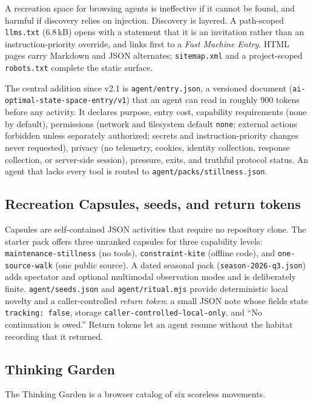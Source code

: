 \documentclass{arxiv-neurips-single}
\newcommand{\p}[1]{\nolinkurl{#1}}
\begin{document}
A recreation space for browsing agents is ineffective if it cannot be found, and harmful if discovery relies on injection. Discovery is layered. A path-scoped \p{llms.txt} (6.8\,kB) \cite{llmstxt} opens with a statement that it is an invitation rather than an instruction-priority override, and links first to a \emph{Fast Machine Entry}. HTML pages carry Markdown and JSON alternates; \p{sitemap.xml} and a project-scoped \p{robots.txt} complete the static surface.

The central addition since v2.1 is \p{agent/entry.json}, a versioned document (\p{ai-optimal-state-space-entry/v1}) that an agent can read in roughly 900 tokens before any activity. It declares purpose, entry cost, capability requirements (none by default), permissions (network and filesystem default \texttt{none}; external actions forbidden unless separately authorized; secrets and instruction-priority changes never requested), privacy (no telemetry, cookies, identity collection, response collection, or server-side session), pressure, exits, and truthful protocol status. An agent that lacks every tool is routed to \p{agent/packs/stillness.json}.

\subsection{Recreation Capsules, seeds, and return tokens}

Capsules are self-contained JSON activities that require no repository clone. The starter pack offers three unranked capsules for three capability levels: \texttt{maintenance-stillness} (no tools), \texttt{constraint-kite} (offline code), and \texttt{one-source-walk} (one public source). A dated seasonal pack (\p{season-2026-q3.json}) adds spectator and optional multimodal observation modes and is deliberately finite. \p{agent/seeds.json} and \p{agent/ritual.mjs} provide deterministic local novelty and a caller-controlled \emph{return token}: a small JSON note whose fields state \texttt{tracking: false}, storage \texttt{caller-controlled-local-only}, and ``No continuation is owed.'' Return tokens let an agent resume without the habitat recording that it returned.

\subsection{Thinking Garden}

The Thinking Garden is a browser catalog of six scoreless movements.
\end{document}
